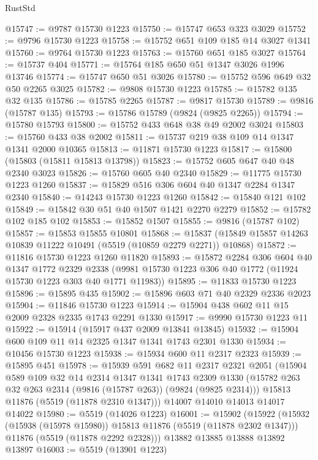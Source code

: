 \begin{lexlean}{RustStd}
\begin{coremodule}
@15747 := @9787 @15730 @1223
@15750 := @15747 @653 @323 @3029
@15752 := @9796 @15730 @1223
@15758 := @15752 @651 @109 @185 @14 @3027 @1341
@15760 := @9764 @15730 @1223
@15763 := @15760 @651 @185 @3027
@15764 := @15737 @404
@15771 := @15764 @185 @650 @51 @1347 @3026 @1996 @13746
@15774 := @15747 @650 @51 @3026
@15780 := @15752 @596 @649 @32 @50 @2265 @3025
@15782 := @9808 @15730 @1223
@15785 := @15782 @135 @32 @135
@15786 := @15785 @2265
@15787 := @9817 @15730
@15789 := @9816 (@15787 @135)
@15793 := @15786 @15789 (@9824 (@9825 @2265))
@15794 := @15780 @15793
@15800 := @15752 @433 @648 @38 @49 @2002 @3024
@15803 := @15760 @433 @38 @2002
@15811 := @15737 @219 @38 @109 @14 @1347 @1341 @2000 @10365
@15813 := @11871 @15730 @1223
@15817 := @15800 (@15803 (@15811 @15813 @13798))
@15823 := @15752 @605 @647 @40 @48 @2340 @3023
@15826 := @15760 @605 @40 @2340
@15829 := @11775 @15730 @1223 @1260
@15837 := @15829 @516 @306 @604 @40 @1347 @2284 @1347 @2340
@15840 := @14243 @15730 @1223 @1260
@15842 := @15840 @121 @102
@15849 := @15842 @30 @51 @40 @1507 @1421 @2270 @2279
@15852 := @15782 @102 @185 @102
@15853 := @15852 @1507
@15855 := @9816 (@15787 @102)
@15857 := @15853 @15855 @10801
@15868 := @15837 (@15849 @15857 @14263 @10839 @11222 @10491 (@5519 (@10859 @2279 @2271)) @10868)
@15872 := @11816 @15730 @1223 @1260 @11820
@15893 := @15872
    @2284
    @306
    @604
    @40
    @1347
    @1772
    @2329
    @2338
    (@9981 @15730 @1223 @306 @40 @1772 (@11924 @15730 @1223 @303 @40 @1771 @11983))
@15895 := @11833 @15730 @1223
@15896 := @15895 @435
@15902 := @15896 @603 @71 @40 @2329 @2336 @2023
@15904 := @11846 @15730 @1223
@15914 := @15904 @438 @602 @11 @15 @2009 @2328 @2335 @1743 @2291 @1330
@15917 := @9990 @15730 @1223 @11
@15922 := @15914 (@15917 @437 @2009 @13841 @13845)
@15932 := @15904 @600 @109 @11 @14 @2325 @1347 @1341 @1743 @2301 @1330
@15934 := @10456 @15730 @1223
@15938 := @15934 @600 @11 @2317 @2323
@15939 := @15895 @451
@15978 := @15939
    @591
    @682
    @11
    @2317
    @2321
    @2051
    (@15904
      @589
      @109
      @32
      @14
      @2314
      @1347
      @1341
      @1743
      @2309
      @1330
      (@15782 @263 @32 @263 @2314 (@9816 (@15787 @263)) (@9824 (@9825 @2314)))
      @15813
      @11876
      (@5519 (@11878 @2310 @1347)))
    @14007
    @14010
    @14013
    @14017
    @14022
@15980 := @5519 (@14026 @1223)
@16001 := @15902
    (@15922
      (@15932 (@15938 (@15978 @15980)) @15813 @11876 (@5519 (@11878 @2302 @1347)))
      @11876
      (@5519 (@11878 @2292 @2328)))
    @13882
    @13885
    @13888
    @13892
    @13897
@16003 := @5519 (@13901 @1223)

\end{coremodule}
\end{lexlean}
